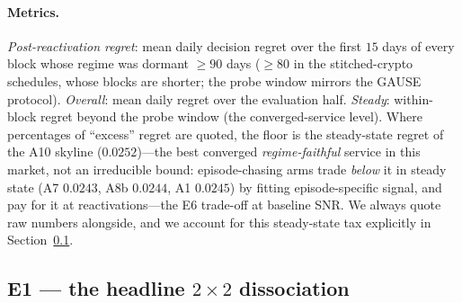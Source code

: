 \documentclass{article}
\begin{document}
\paragraph{Metrics.} \emph{Post-reactivation regret}: mean daily decision
regret over the first $15$ days of every block whose regime was dormant
$\ge 90$ days ($\ge 80$ in the stitched-crypto schedules, whose blocks
are shorter; the probe window mirrors the GAUSE protocol).
\emph{Overall}: mean daily regret over the evaluation half. \emph{Steady}:
within-block regret beyond the probe window (the converged-service level).
Where percentages of ``excess'' regret are quoted, the floor is the
steady-state regret of the A10 skyline ($0.0252$)---the best converged
\emph{regime-faithful} service in this market, not an irreducible bound:
episode-chasing arms trade \emph{below} it in steady state (A7 $0.0243$,
A8b $0.0244$, A1 $0.0245$) by fitting episode-specific signal, and pay
for it at reactivations---the E6 trade-off at baseline SNR. We always
quote raw numbers alongside, and we account for this steady-state tax
explicitly in Section~\ref{sec:e1}.

\subsection{E1 --- the headline $2{\times}2$ dissociation}
\label{sec:e1}
\end{document}
